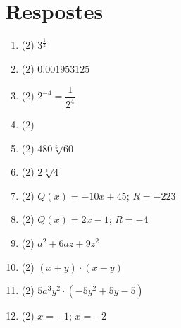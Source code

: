 \documentclass[a4paper]{article},
\begin{document}
  \section*{Respostes}
  \begin{enumerate}
    \item 
    \begin{tasks}(2)
      \task $3^{\frac{1}{2}}$
    \end{tasks}
    \item 
    \begin{tasks}(2)
      \task $0.001953125$
    \end{tasks}
    \item 
    \begin{tasks}(2)
      \task $2^{-4} = \dfrac{1}{2^{4}}$
    \end{tasks}
    \item 
    \begin{tasks}(2)
    \end{tasks}
    \item 
    \begin{tasks}(2)
      \task $480  \sqrt[5]{60}$
    \end{tasks}
    \item 
    \begin{tasks}(2)
      \task $2  \sqrt[3]{4}$
    \end{tasks}
    \item 
    \begin{tasks}(2)
      \task $Q(x)=-10 x + 45$; $R=-223$ 
    \end{tasks}
    \item 
    \begin{tasks}(2)
      \task $Q(x)=2 x -1$; $R=-4$ 
    \end{tasks}
    \item 
    \begin{tasks}(2)
      \task $a^{2} +6 a z +9 z^{2}$ 
    \end{tasks}
    \item 
    \begin{tasks}(2)
      \task $\left(x + y\right) \cdot \left(x - y\right)$ 
    \end{tasks}
    \item 
    \begin{tasks}(2)
      \task $5 a^{3} y^{2} \cdot \left(-5 y^{2} +5 y -5\right)$ 
    \end{tasks}
    \item 
    \begin{tasks}(2)
      \task $x=-1$; $x=-2$

\end{tasks}
\end{enumerate}
\end{document}

